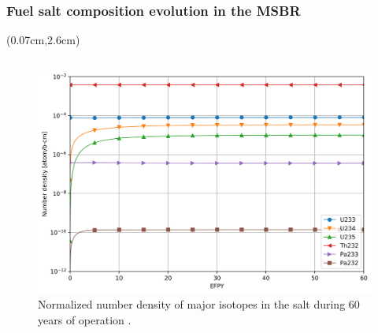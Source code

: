 \begin{frame}
\frametitle{Fuel salt composition evolution in the MSBR}
\begin{textblock*}{12.8cm}(0.07cm,2.6cm) %
\begin{columns}
	\column[t]{7cm}
	\vspace{-0.35in}
	\begin{figure}[t]
		\hspace{-5mm}
		\includegraphics[height=0.7\textheight]{../dissertation/figures/ch3/major_isotopes_adens.png}
		\vspace{-0.15in}
		\caption{Normalized number density of major isotopes in the salt
			during 60 years of operation \cite{rykhlevskii_advanced_2018}.}
	\end{figure}
	

\end{columns}
\end{textblock*}
\end{frame}

